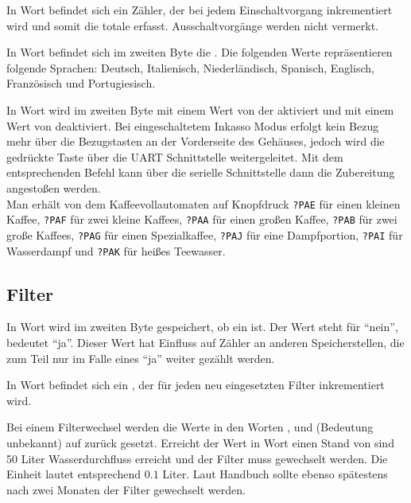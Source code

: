 In Wort  befindet sich ein Zähler, der bei jedem Einschaltvorgang inkrementiert wird und somit die totale  erfasst.
Ausschaltvorgänge werden nicht vermerkt.

In Wort  befindet sich im zweiten Byte die .
Die folgenden Werte repräsentieren folgende Sprachen:
 Deutsch,
 Italienisch,
 Niederländisch, 
 Spanisch,
 Englisch,
 Französisch und
 Portugiesisch.

In Wort  wird im zweiten Byte mit einem Wert von  der  aktiviert und mit einem Wert von  deaktiviert.
Bei eingeschaltetem Inkasso Modus erfolgt kein Bezug mehr über die Bezugstasten an der Vorderseite des Gehäuses, jedoch wird die gedrückte Taste über die \ac{UART} Schnittstelle weitergeleitet.
Mit dem entsprechenden Befehl kann über die serielle Schnittstelle dann die Zubereitung angestoßen werden.\\
Man erhält von dem Kaffeevollautomaten auf Knopfdruck
\texttt{?PAE} für einen kleinen Kaffee,
\texttt{?PAF} für zwei kleine Kaffees,
\texttt{?PAA} für einen großen Kaffee,
\texttt{?PAB} für zwei große Kaffees,
\texttt{?PAG} für einen Spezialkaffee,
\texttt{?PAJ} für eine Dampfportion,
\texttt{?PAI} für Wasserdampf und
\texttt{?PAK} für heißes Teewasser.

\subsection{Filter}
In Wort  wird im zweiten Byte gespeichert, ob ein  ist.
Der Wert  steht für "`nein"',  bedeutet "`ja"'.
Dieser Wert hat Einfluss auf Zähler an anderen Speicherstellen, die zum Teil nur im Falle eines "`ja"' weiter gezählt werden.

In Wort  befindet sich ein , der für jeden neu eingesetzten Filter inkrementiert wird.

Bei einem Filterwechsel werden die Werte in den Worten ,  und  (Bedeutung unbekannt) auf  zurück gesetzt.
Erreicht der Wert in Wort  einen Stand von  sind 50 Liter Wasserdurchfluss erreicht und der Filter muss gewechselt werden.
Die Einheit lautet entsprechend $0.1$ Liter.
Laut Handbuch sollte ebenso spätestens nach zwei Monaten der Filter gewechselt werden.

